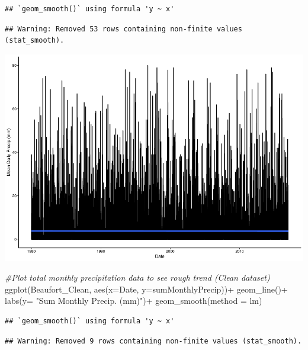 \documentclass[
  12pt,
]{article}
\newenvironment{Shaded}{\begin{snugshade}}{\end{snugshade}}
\newcommand{\AttributeTok}[1]{\textcolor[rgb]{0.77,0.63,0.00}{#1}}
\newcommand{\CommentTok}[1]{\textcolor[rgb]{0.56,0.35,0.01}{\textit{#1}}}
\newcommand{\FunctionTok}[1]{\textcolor[rgb]{0.00,0.00,0.00}{#1}}
\newcommand{\NormalTok}[1]{#1}
\newcommand{\SpecialCharTok}[1]{\textcolor[rgb]{0.00,0.00,0.00}{#1}}
\newcommand{\StringTok}[1]{\textcolor[rgb]{0.31,0.60,0.02}{#1}}
\begin{document}
\begin{verbatim}
## `geom_smooth()` using formula 'y ~ x'
\end{verbatim}

\begin{verbatim}
## Warning: Removed 53 rows containing non-finite values (stat_smooth).
\end{verbatim}

\includegraphics{Project_Template_TLK_files/figure-latex/clean-1.pdf}

\begin{Shaded}
\begin{Highlighting}[]
\CommentTok{\#Plot total monthly precipitation data to see rough trend (Clean dataset)}
\FunctionTok{ggplot}\NormalTok{(Beaufort\_Clean, }\FunctionTok{aes}\NormalTok{(}\AttributeTok{x=}\NormalTok{Date, }\AttributeTok{y=}\NormalTok{sumMonthlyPrecip))}\SpecialCharTok{+}
  \FunctionTok{geom\_line}\NormalTok{()}\SpecialCharTok{+}
  \FunctionTok{labs}\NormalTok{(}\AttributeTok{y=} \StringTok{"Sum Monthly Precip. (mm)"}\NormalTok{)}\SpecialCharTok{+}
  \FunctionTok{geom\_smooth}\NormalTok{(}\AttributeTok{method =}\NormalTok{ lm) }
\end{Highlighting}
\end{Shaded}

\begin{verbatim}
## `geom_smooth()` using formula 'y ~ x'
\end{verbatim}

\begin{verbatim}
## Warning: Removed 9 rows containing non-finite values (stat_smooth).
\end{verbatim}
\end{document}
